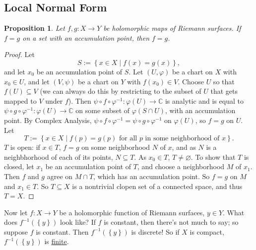 \documentclass[12pt]{article}
\newcommand{\cx}{\mathbb{C}}
\newcommand\inv[1]{#1^{-1}}
\newcommand\setb[1]{\left \{ #1 \right \}}
\newtheorem{proposition}[theorem]{Proposition}
\theoremstyle{definition}
\theoremstyle{remark}
\begin{document}
\subsection{Local Normal Form}
\begin{proposition}
    Let $f , g : X \to Y$ be holomorphic maps of Riemann surfaces. If $f = g$ on a set with an accumulation point, then $f = g$.
\end{proposition}
\begin{proof}
    Let 
    \begin{equation}
        S := \setb{ x \in X \mid f(x) = g(x) },
    \end{equation}
    and let $x_0$ be an accumulation point of $S$. Let $(U , \varphi)$ be a chart on $X$ with $x_0 \in U$, and let $(V , \psi)$ be a chart on $Y$ with $f(x_0) \in V$. Choose $U$ so that $f(U) \subseteq V$ (we can always do this by restricting to the subset of $U$ that gets mapped to $V$ under $f$). Then $\psi \circ f \circ \inv{\varphi} : \varphi(U) \to \cx$ is analytic and is equal to $\psi \circ g \circ \inv{\varphi} : \varphi(U) \to \cx$ on some subset of $\varphi(S \cap U)$, with an accumulation point. By Complex Analysis, $\psi \circ f \circ \inv{\varphi} = \psi \circ g \circ \inv{\varphi}$ on $\varphi(U)$, so $f = g$ on $U$. Let 
    \begin{equation}
        T := \setb{x \in X \mid f(p) = g(p) \text{ for all $p$ in some neighborhood of $x$}}.
    \end{equation}
    $T$ is open: if $x \in T$, $f = g$ on some neighborhood $N$ of $x$, and as $N$ is a neighbhorhood of each of its points, $N \subseteq T$. As $x_0 \in T$, $T \neq \varnothing$. To show that $T$ is closed, let $x_1$ be an accumulation point of $T$, and choose a neighborhood $M$ of $x_1$. Then $f$ and $g$ agree on $M \cap T$, which has an accumulation point. So $f = g$ on $M$ and $x_1 \in T$. So $T \subseteq X$ is a nontrivial clopen set of a connected space, and thus $T = X$.
\end{proof}
Now let $f : X \to Y$ be a holomorphic function of Riemann surfaces, $y \in Y$. What does $\inv{f} \left( \setb{y} \right)$ look like? If $f$ is constant, then there's not much to say; so suppose $f$ is constant. Then $\inv{f} \left( \setb{y} \right)$ is discrete! So if $X$ is compact, $\inv{f} \left( \setb{y} \right)$ is \underline{finite}.
\end{document}

